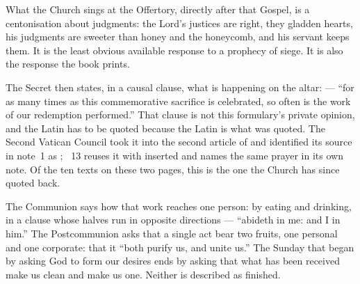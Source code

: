 What the Church sings at the Offertory, directly after that Gospel, is a
centonisation about judgments: the Lord's justices are right, they gladden
hearts, his judgments are sweeter than honey and the honeycomb, and his
servant keeps them. It is the least obvious available response to a prophecy
of siege. It is also the response the book prints.

The Secret then states, in a causal clause, what is happening on the altar:
 --- ``for as many times as this commemorative
sacrifice is celebrated, so often is the work of our redemption performed.''
That clause is not this formulary's private opinion, and the Latin has to be
quoted because the Latin is what was quoted. The Second Vatican Council took
it into the second article of  and identified its
source in note~1 as ; ~13 reuses it with
 inserted and names the same prayer in its own note. Of the
ten texts on these two pages, this is the one the Church has since quoted
back.

The Communion says how that work reaches one person: by eating and drinking,
in a clause whose halves run in opposite directions --- ``abideth in me: and I
in him.'' The Postcommunion asks that a single act bear two fruits, one
personal and one corporate: that it ``both purify us, and unite us.'' The
Sunday that began by asking God to form our desires ends by asking that what
has been received make us clean and make us one. Neither is described as
finished.

\label{triptych:brief-synthesis:end}
\clearpage
